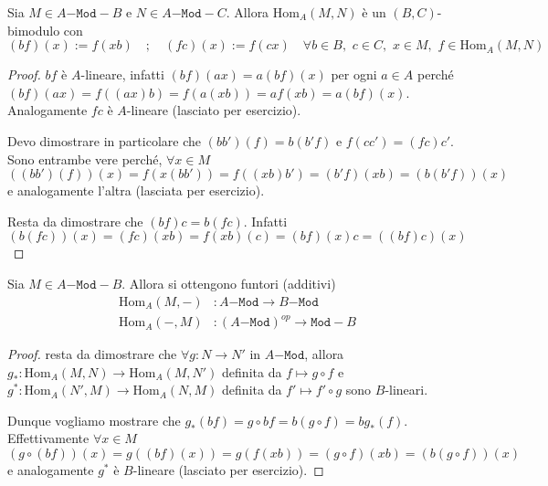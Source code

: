 \begin{proposition}{}
    Sia \(M \in A\mathtt{-Mod-}B\) e \(N \in A\mathtt{-Mod-}C\). Allora
    \(\mathrm{Hom}_A{(M,N)}\) è un \({(B, C)}\)-bimodulo con 
    \[
      {(bf)}{(x)} := f{(xb)} \quad ; \quad {(fc)}{(x)} := f{(cx)} \quad \forall
      b \in B, \,\, c \in C,\,\, x \in M,\,\, f \in \mathrm{Hom}_A{(M, N)}
    \]
\end{proposition}
\begin{proof}{}
    \(bf\) è \(A\)-lineare, infatti \({(bf)}{(ax)} = a {(bf)}{(x)}\) per ogni
    \(a \in A\) perché \({(bf)}{(ax)} = f{({(ax)}b)} = f{(a{(xb)})} = af{(xb)} = a
    {(bf)}{(x)}\).
    Analogamente \(fc\) è \(A\)-lineare (lasciato per esercizio). %

    Devo dimostrare in particolare che \({(bb')}{(f)} = b{(b'f)}\) e \(f{(c c')}
    = {(fc)}c'\). Sono entrambe vere perché, \(\forall x \in M\) 
    \[
    {({(b b')}{(f)})}{(x)} = f{(x{(b b')})} = f{({(xb)}b')} = {(b'f)}{(xb)} =
    {(b{(b'f)})}{(x)}
    \]
    e analogamente l'altra (lasciata per esercizio). %

    Resta da dimostrare che \({(bf)}c = b{(fc)}\). Infatti
    \[
      {(b{(fc)})}{(x)} = {(fc)}{(xb)} = f{(xb)}{(c)} = {(bf)}{(x)}c =
      {({(bf)}c)}{(x)}
    \]
\end{proof}
\begin{corollary}{}
    Sia \(M \in A\mathtt{-Mod-}B\). Allora si ottengono funtori (additivi) 
    \begin{align*}
      \mathrm{Hom}_A {(M, -)}&: A\mathtt{-Mod} \to B\mathtt{-Mod} \\
      \mathrm{Hom}_A {(-, M)}&: {(A\mathtt{-Mod})}^{op} \to \mathtt{Mod-}B
    \end{align*}
\end{corollary}
\begin{proof}{}
    resta da dimostrare che \(\forall g : N \to N'\) in \(A\mathtt{-Mod}\),
    allora \(g_* : \mathrm{Hom}_A{(M, N)} \to \mathrm{Hom}_A{(M,N')}\) definita
    da \(f \mapsto g \circ f\) e \(g^{*} : \mathrm{Hom}_A{(N', M)} \to
    \mathrm{Hom}_A{(N, M)}\) definita da \(f' \mapsto f' \circ g\)  sono
    \(B\)-lineari.

    Dunque vogliamo mostrare che \(g_*{(bf)} = g \circ bf = b{(g \circ f)} =
    bg_*{(f)}\). Effettivamente \(\forall x \in M\) 
    \[
    {(g \circ {(bf)})}{(x)} = g{({(bf)}{(x)})} = g{(f{(xb)})} = {(g \circ
    f)}{(xb)} = {(b{(g \circ f)})}{(x)}
    \]
    e analogamente \(g^{*}\) è \(B\)-lineare (lasciato per esercizio). %
\end{proof}

